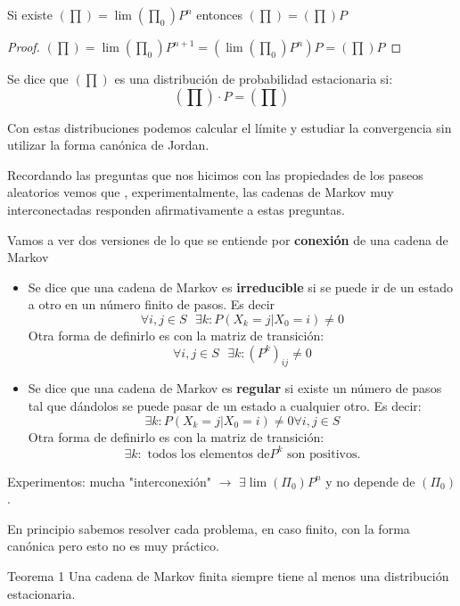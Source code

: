 \obs Si existe $(\prod) = \lim (\prod_0) P^n$ entonces $(\prod) = (\prod) P$
\begin{proof}
	$(\prod) = \lim(\prod_0) P^{n+1} = (\lim (\prod_0)P^n)P = (\prod) P$
\end{proof}

\begin{defn}
	Se dice que $(\prod)$ es una distribución de probabilidad estacionaria si:
	$$(\prod)\cdot P = (\prod)$$	
\end{defn}

\obs Con estas distribuciones podemos calcular el límite y estudiar la convergencia sin utilizar la forma canónica de Jordan.


Recordando las preguntas que nos hicimos con las propiedades de los paseos aleatorios vemos que , experimentalmente, las cadenas de Markov muy interconectadas responden afirmativamente a estas preguntas.

Vamos a ver dos versiones de lo que se entiende por \textbf{conexión} de una cadena de Markov
\begin{itemize}
	\item \begin{defn}[Irreducible]
		Se dice que una cadena de Markov es \textbf{irreducible} si se puede ir de un estado a otro en un número finito de pasos. Es decir
		$$\forall i,j \in S\text{    }\exists k : P(X_k = j| X_0 = i) \neq 0$$
		Otra forma de definirlo es con la matriz de transición:
		$$\forall i,j \in S \text{    }\exists k: (P^k)_{ij} \neq 0$$
	\end{defn}
	\item \begin{defn}[Regular]
		Se dice que una cadena de Markov es \textbf{regular} si existe un número de pasos tal que dándolos se puede pasar de un estado a cualquier otro. Es decir:
		$$ \exists k : P(X_k = j| X_0 = i) \neq 0  \forall i,j \in S $$
		Otra forma de definirlo es con la matriz de transición:
		$$\exists k : \text{ todos los elementos de} P^k \text{ son positivos.}$$
	\end{defn}
\end{itemize}


Experimentos: mucha "interconexión" $\rightarrow$ $\exists \lim (\Pi_0)P^n$ y no depende de $(\Pi_0)$.

En principio sabemos resolver cada problema, en caso finito, con la forma canónica pero esto no es muy práctico.

\begin{theorem}{Teorema 1}
	\label{Markov_tma1}
	Una cadena de Markov finita siempre tiene al menos una distribución estacionaria.
\end{theorem}

